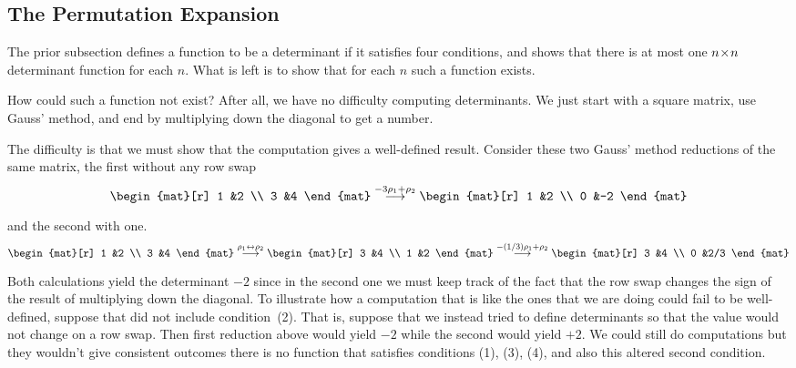 \subsection{The Permutation Expansion}
The prior subsection defines a function to be a determinant if it
satisfies four conditions, and
shows that there is at most one $n \! \times \! n$ determinant function for
each $n$.
What is left is to show that for each $n$ such a function exists.

How could such a function not exist?
After all, we have no difficulty computing determinants. 
We just start with a square matrix,
use Gauss' method, and end by multiplying down the diagonal to
get a number.

The difficulty is that we must show that 
the computation gives a well-defined result.
Consider these two Gauss' method reductions
of the same matrix, the first without any row swap
\begin{equation*}
  \begin{mat}[r]
    1  &2  \\
    3  &4
  \end{mat}
  \grstep{-3\rho_1+\rho_2}
  \begin{mat}[r]
    1  &2  \\
    0  &-2
  \end{mat}
\end{equation*}
and the second with one.
\begin{equation*}
  \begin{mat}[r]
    1  &2  \\
    3  &4
  \end{mat}
  \grstep{\rho_1\leftrightarrow\rho_2}
  \begin{mat}[r]
    3  &4  \\
    1  &2
  \end{mat}
  \grstep{-(1/3)\rho_1+\rho_2}
  \begin{mat}[r]
    3  &4  \\
    0  &2/3
  \end{mat}
\end{equation*}
Both
calculations yield the determinant $-2$ 
since in the second one
we must keep track of the fact that the row swap changes the sign of the result
of multiplying down the diagonal.
To illustrate how a computation that is like the ones that we are doing could 
fail to be well-defined, 
suppose that  did not include condition~(2). 
That is, suppose that we instead tried to define determinants so that
the value would not change on a row swap.
Then first reduction above would
yield $-2$ while the second would yield $+2$.
We could still do computations but they wouldn't give consistent outcomes\Dash
there is no 
function that satisfies conditions (1), (3), (4), and also this
altered second condition. 

